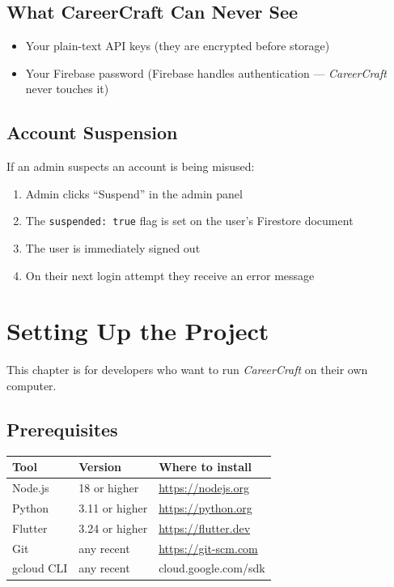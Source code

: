 \documentclass[12pt, a4paper]{report}
\newcommand{\cc}{\textit{CareerCraft}}
\newcommand{\code}[1]{\texttt{\small #1}}
\begin{document}
\section{What CareerCraft Can Never See}

\begin{itemize}
  \item Your plain-text API keys (they are encrypted before storage)
  \item Your Firebase password (Firebase handles authentication --- \cc{} never touches it)
\end{itemize}

\section{Account Suspension}

If an admin suspects an account is being misused:
\begin{enumerate}
  \item Admin clicks ``Suspend'' in the admin panel
  \item The \code{suspended: true} flag is set on the user's Firestore document
  \item The user is immediately signed out
  \item On their next login attempt they receive an error message
\end{enumerate}

\chapter{Setting Up the Project}

This chapter is for developers who want to run \cc{} on their own computer.

\section{Prerequisites}

\begin{center}
\begin{tabular}{lll}
\toprule
\textbf{Tool} & \textbf{Version} & \textbf{Where to install} \\
\midrule
Node.js  & 18 or higher & \url{https://nodejs.org} \\
Python   & 3.11 or higher & \url{https://python.org} \\
Flutter  & 3.24 or higher & \url{https://flutter.dev} \\
Git      & any recent & \url{https://git-scm.com} \\
gcloud CLI & any recent & cloud.google.com/sdk \\
\bottomrule
\end{tabular}
\end{center}
\end{document}

